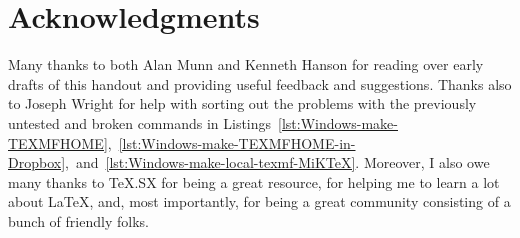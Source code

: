 
\section{Acknowledgments}
\label{sec:acknowledgments}

Many thanks to both Alan Munn and Kenneth Hanson for reading over early drafts of this handout and providing useful feedback and suggestions.
Thanks also to Joseph Wright for help with sorting out the problems with the previously untested and broken commands in Listings~\ref{lst:Windows-make-TEXMFHOME},~\ref{lst:Windows-make-TEXMFHOME-in-Dropbox},~and~\ref{lst:Windows-make-local-texmf-MiKTeX}.
Moreover, I also owe many thanks to TeX.SX for being a great resource, for helping me to learn a lot about \LaTeX, and, most importantly, for being a great community consisting of a bunch of friendly folks. \resizebox*{!}{1em}{\rubberduck}